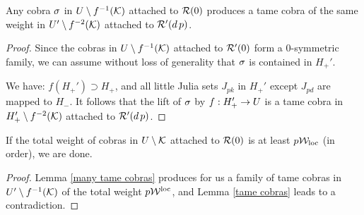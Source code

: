 {{%

\begin{lem}\label{many tame cobras} 
 Any cobra ${\sigma}$ in $U \setminus f^{-1} ({\mathcal K})$ attached to  ${\mathcal R}(0)$ produces a tame cobra
 of the same weight in $U' \setminus f^{-2} ({\mathcal K})$ attached to ${\mathcal R}'(d\, p)$. 
\end{lem}

\begin{proof}
   Since the cobras in $U\setminus f^{-1}({\mathcal K})$ attached to ${\mathcal R}'(0)$ form a $0$-symmetric 
family, we can assume without loss of generality that ${\sigma}$ is
contained in $H_+'$. 

    We have: $f(H_+')\supset H_+$,  %
and all little Julia sets $J_{pk}$ in $H_+'$ except $J_{pd}$ are mapped
to $H_-$. It follows that the  lift of ${\sigma}$ 
 by $f:  H_+' \rightarrow U $  is a  tame cobra in $H_+'\setminus f^{-2}({\mathcal K})$ attached to
${\mathcal R}'(d\, p)$. 
\end{proof}


\begin{lem}
   If the total weight of cobras in $U\setminus {\mathcal K}$ attached to ${\mathcal R}(0)$ 
is at least  $p {\mathcal W}_{\mathrm{loc}}$ (in order), we are done. 
\end{lem}

\begin{proof}
%
    Lemma \ref{many tame cobras} produces for us a family of tame
  cobras in $U'\setminus f^{-1}({\mathcal K})$ of the total weight $p{\mathcal W}^{\mathrm{loc}}$,
and Lemma \ref{tame cobras} leads to a contradiction. 
\end{proof}




}}
